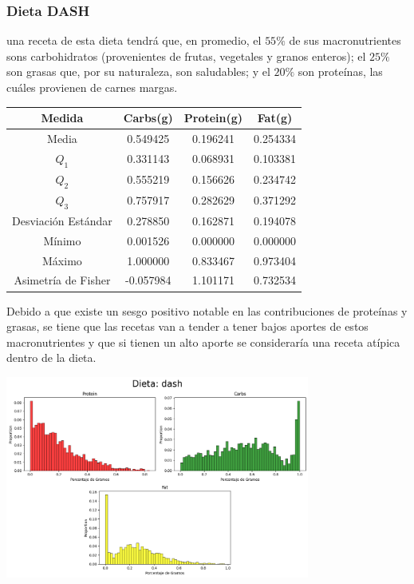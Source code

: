 \documentclass[12pt,a4paper]{article}
\begin{document}
    \subsubsection{Dieta DASH}
        una receta de esta dieta tendrá que, en promedio, el $55\%$ de sus 
        macronutrientes sons carbohidratos (provenientes de frutas, vegetales 
        y granos enteros); el $25\%$ son grasas que, por su naturaleza, son 
        saludables; y el $20\%$ son proteínas, las cuáles provienen de carnes margas.
        \begin{center}
            \begin{tabular}{|c|ccc|}
                \hline
                Medida & Carbs(g) & Protein(g) & Fat(g) \\
                \hline
                Media               & 0.549425 & 0.196241 & 0.254334  \\
                $Q_1$               & 0.331143 & 0.068931 & 0.103381  \\
                $Q_2$               & 0.555219 & 0.156626 & 0.234742  \\
                $Q_3$               & 0.757917 & 0.282629 &	0.371292  \\
                Desviación Estándar & 0.278850 & 0.162871 & 0.194078  \\
                Mínimo              & 0.001526 & 0.000000 & 0.000000  \\
                Máximo              & 1.000000 & 0.833467 & 0.973404  \\
                Asimetría de Fisher & -0.057984 & 1.101171 & 0.732534  \\
                \hline
            \end{tabular}
        \end{center}
        Debido a que existe un sesgo positivo notable en las contribuciones de 
        proteínas y grasas, se tiene que las recetas van a tender a tener bajos 
        aportes de estos macronutrientes y que si tienen un alto aporte se 
        consideraría una receta atípica dentro de la dieta.
        \begin{center}
            \includegraphics[width=0.75\textwidth]{Resources/2_03_plot_01.png}
        \end{center}
\end{document}
